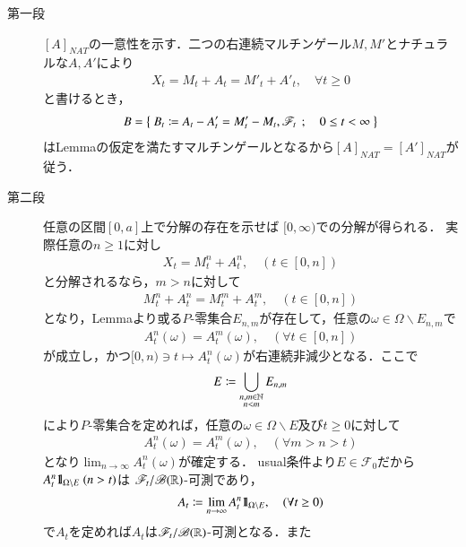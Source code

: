 	\begin{prf}\mbox{}
		\begin{description}
			\item[第一段]
				$[A]_{NAT}$の一意性を示す．二つの右連続マルチンゲール$M,M'$とナチュラルな$A,A'$により
				\begin{align}
					X_t = M_t + A_t = M'_t + A'_t,
					\quad \forall t \geq 0
				\end{align}
				と書けるとき，
				\begin{align}
					B=\left\{\ B_t \coloneqq A_t - A'_t = M'_t - M_t,\mathscr{F}_t\ \, ; \quad 0 \leq t < \infty\ \right\}
				\end{align}
				はLemmaの仮定を満たすマルチンゲールとなるから$[A]_{NAT} = [A']_{NAT}$が従う．
				
			\item[第二段]
				任意の区間$[0,a]$上で分解の存在を示せば
				$[0,\infty)$での分解が得られる．
				実際任意の$n \geq 1$に対し
				\begin{align}
					X_t = M^n_t + A^n_t, \quad (t \in [0,n])
				\end{align}
				と分解されるなら，$m > n$に対して
				\begin{align}
					M^n_t + A^n_t = M^m_t + A^m_t, \quad (t \in [0,n])
				\end{align}
				となり，Lemmaより或る$P$-零集合$E_{n,m}$が存在して，任意の$\omega \in \Omega \backslash E_{n,m}$で
				\begin{align}
					A^n_t(\omega) = A^m_t(\omega), \quad (\forall t \in [0,n])
				\end{align}
				が成立し，かつ$[0,n) \ni t \longmapsto A^n_t(\omega)$が右連続非減少となる．ここで
				\begin{align}
					E \coloneqq \bigcup_{\substack{n,m \in \mathbb{N} \\ n<m}} E_{n,m}
				\end{align}
				により$P$-零集合を定めれば，任意の$\omega \in \Omega \backslash E$及び$t \geq 0$に対して
				\begin{align}
					A^n_t(\omega) = A^m_t(\omega), \quad (\forall m > n > t)
				\end{align}
				となり$\lim_{n \to \infty} A^n_t(\omega)$が確定する．
				usual条件より$E \in \mathscr{F}_0$だから$A^n_t \mbox{1}\hspace{-0.25em}\mbox{l}_{\Omega \backslash E}\ (n > t)$は
				$\mathscr{F}_t/\mathscr{B}(\mathbb{R})$-可測であり，
				\begin{align}
					A_t \coloneqq  \lim_{n \to \infty} A^n_t \mbox{1}\hspace{-0.25em}\mbox{l}_{\Omega \backslash E},
					\quad (\forall t \geq 0)
				\end{align}
				で$A_t$を定めれば$A_t$は$\mathscr{F}_t/\mathscr{B}(\mathbb{R})$-可測となる．また

\end{description}
\end{prf}
